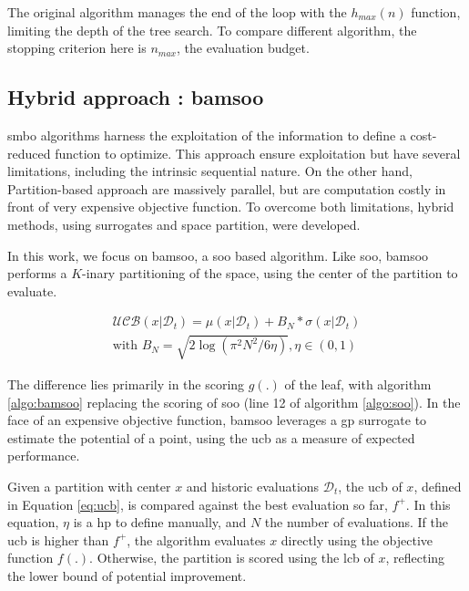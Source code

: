 The original algorithm manages the end of the loop with the $h_{max}(n)$ function, limiting the depth of the tree search. To compare different algorithm, the stopping criterion here is $n_{max}$, the evaluation budget. 


\subsection{Hybrid approach : \acrfull{bamsoo}}
\label{sec:bamsoo}
\acrfull{smbo} algorithms harness the exploitation of the information to define a cost-reduced function to optimize. This approach ensure exploitation but have several limitations, including the intrinsic sequential nature. On the other hand, Partition-based approach are massively parallel, but are computation costly in front of very expensive objective function. To overcome both limitations, hybrid methods, using surrogates and space partition, were developed.

In this work, we focus on \acrshort{bamsoo}, a \acrshort{soo} based algorithm. Like \acrshort{soo}, \acrshort{bamsoo} performs a $K$-inary partitioning of the space, using the center of the partition to evaluate. 

\begin{equation}
    \begin{split}
    \mathcal{UCB}(x| \mathcal D_t) = \mu(x|\mathcal D_t) +  B_N * \sigma(x|\mathcal D_t) 
    \\ \text{with } B_N = \sqrt{2 \log (\pi^2 N^2/6 \eta)} , \eta \in (0,1)      
    \end{split}  
    \label{eq:ucb}
\end{equation}

The difference lies primarily in the scoring $g(.)$ of the leaf, with algorithm \ref{algo:bamsoo} replacing the scoring of \acrshort{soo} (line 12 of algorithm \ref{algo:soo}). In the face of an expensive objective function, \acrshort{bamsoo} leverages a \acrshort{gp} surrogate to estimate the potential of a point, using the \acrfull{ucb} as a measure of expected performance. 

Given a partition with center $x$ and historic evaluations $\mathcal{D}_t$, the \acrshort{ucb} of $x$, defined in Equation \ref{eq:ucb}, is compared against the best evaluation so far, $f^+$. In this equation, $\eta$ is a \gls{hp} to define manually, and $N$ the number of evaluations. If the \acrshort{ucb} is higher than $f^+$, the algorithm evaluates $x$ directly using the objective function $f(.)$. Otherwise, the partition is scored using the \acrfull{lcb} of $x$, reflecting the lower bound of potential improvement.

